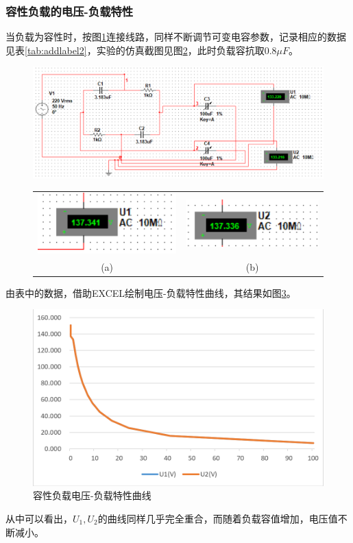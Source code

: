 \documentclass[12pt]{article}%
\begin{document}
\subsubsection{容性负载的电压-负载特性}
当负载为容性时，按图\ref{fig:a12}连接线路，同样不断调节可变电容参数，记录相应的数据见表\ref{tab:addlabel2}，实验的仿真截图见图\ref{fig:x11}，此时负载容抗取$0.8\mu F$。
\begin{figure}[htbp]
\centering\includegraphics[width=\linewidth]{TIM20180531183801.png}
\caption{\heiti{}}\label{fig:a12}
\end{figure}
\begin{figure}[htbp]
\centering
\begin{tabular}{cc}
\includegraphics[width=0.4\linewidth]{TIM20180607115514.png}&
\includegraphics[width=0.4\linewidth]{TIM20180607115606.png}\\
(a)&(b)\\
\end{tabular}
\caption{\heiti{}}\label{fig:x11}
\end{figure}

由表中的数据，借助EXCEL绘制电压-负载特性曲线，其结果如图\ref{fig:a121}。\par
\begin{figure}[htbp]
\centering\includegraphics[width=0.8\linewidth]{TIM20180531191032.png}
\caption{\heiti{}容性负载电压-负载特性曲线}\label{fig:a121}
\end{figure}
从中可以看出，$U_1,U_2$的曲线同样几乎完全重合，而随着负载容值增加，电压值不断减小。
\end{document}
